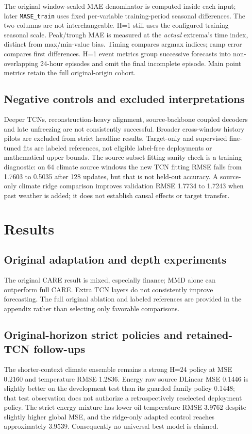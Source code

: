 \documentclass[twoside,english]{article}
\begin{document}
The original window-scaled MAE denominator is computed inside each input; later \texttt{MASE\_train} uses fixed per-variable training-period seasonal differences. The two columns are not interchangeable. H=1 still uses the configured training seasonal scale. Peak/trough MAE is measured at the \emph{actual} extrema's time index, distinct from max/min-value bias. Timing compares argmax indices; ramp error compares first differences. H=1 event metrics group successive forecasts into non-overlapping 24-hour episodes and omit the final incomplete episode. Main point metrics retain the full original-origin cohort.

\subsection{Negative controls and excluded interpretations}
Deeper TCNs, reconstruction-heavy alignment, source-backbone coupled decoders and late unfreezing are not consistently successful. Broader cross-window history pilots are excluded from strict headline results. Target-only and supervised fine-tuned fits are labeled references, not eligible label-free deployments or mathematical upper bounds. The source-subset fitting sanity check is a training diagnostic: on 64 climate source windows the new TCN fitting RMSE falls from 1.7603 to 0.5035 after 128 updates, but that is not held-out accuracy. A source-only climate ridge comparison improves validation RMSE 1.7734 to 1.7243 when past weather is added; it does not establish causal effects or target transfer.

\section{Results}\label{sec:results}
\subsection{Original adaptation and depth experiments}



The original CARE result is mixed, especially finance; MMD alone can outperform full CARE. Extra TCN layers do not consistently improve forecasting. The full original ablation and labeled references are provided in the appendix rather than selecting only favorable comparisons.

\subsection{Original-horizon strict policies and retained-TCN follow-ups}



The shorter-context climate ensemble remains a strong H=24 policy at MSE 0.2160 and temperature RMSE 1.2836. Energy raw source DLinear MSE 0.1446 is slightly better on the development test than its guarded family policy 0.1448; that test observation does not authorize a retrospectively reselected deployment policy. The strict energy mixture has lower oil-temperature RMSE 3.9762 despite slightly higher global MSE, and the ridge-only adapted control reaches approximately 3.9539. Consequently no universal best model is claimed.
\end{document}

